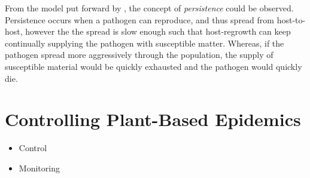From the model put forward by \cite{park2001invasion}, the concept of \textit{persistence} could be observed. Persistence occurs when a pathogen can reproduce, and thus spread from host-to-host, however the the spread is slow enough such that host-regrowth can keep continually supplying the pathogen with susceptible matter. Whereas, if the pathogen spread more aggressively through the population, the supply of susceptible material would be quickly exhausted and the pathogen would quickly die.



\section{Controlling Plant-Based Epidemics}
\label{ch2:control-review}

\begin{itemize}
    \item Control
    \item Monitoring
\end{itemize}

\blindtext




